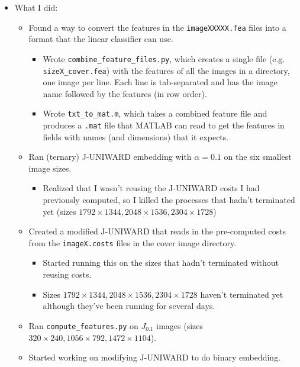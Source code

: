 \documentclass[11pt,a4paper]{report}
\begin{document}
\begin{itemize}

\item What I did:
  \begin{itemize}
  \item Found a way to convert the features in the \texttt{imageXXXXX.fea} files into a format that the linear classifier can use.
    \begin{itemize}
    \item Wrote \texttt{combine\_feature\_files.py}, which creates a single file (e.g. \texttt{sizeX\_cover.fea}) with the features of all the images in a directory, one image per line. Each line is tab-separated and has the image name followed by the features (in row order).
    \item Wrote \texttt{txt\_to\_mat.m}, which takes a combined feature file and produces a \texttt{.mat} file that MATLAB can read to get the features in fields with names (and dimensions) that it expects.
    \end{itemize}

  \item Ran (ternary) J-UNIWARD embedding with $\alpha = 0.1$ on the six smallest image sizes.
    \begin{itemize}
    \item Realized that I wasn't reusing the J-UNIWARD costs I had previously computed, so I killed the processes that hadn't terminated yet (sizes  $1792 \times 1344, 2048 \times 1536, 2304 \times 1728$)
    \end{itemize}

  \item Created a modified J-UNIWARD that reads in the pre-computed costs from the \texttt{imageX.costs} files in the cover image directory.
    \begin{itemize}
    \item Started running this on the sizes that hadn't terminated without reusing costs.
    \item Sizes $1792 \times 1344, 2048 \times 1536, 2304 \times 1728$ haven't terminated yet although they've been running for several days.
    \end{itemize}

  \item Ran \texttt{compute\_features.py} on $J_{0.1}$ images (sizes $320 \times 240, 1056 \times 792, 1472 \times 1104$).
  
  \item Started working on modifying J-UNIWARD to do binary embedding.
  \end{itemize}

\end{itemize}
\end{document}
